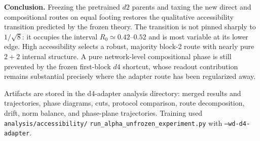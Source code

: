\documentclass[10pt]{article}
\begin{document}
\textbf{Conclusion.}
Freezing the pretrained $d2$ parents and taxing the new direct and compositional routes on
equal footing restores the qualitative accessibility transition predicted by the frozen
theory.  The transition is not pinned sharply to $1/\sqrt8$: it occupies the interval
$R_0\simeq0.42$--$0.52$ and is most variable at its lower edge.  High accessibility selects
a robust, majority block-2 route with nearly pure $2{+}2$ internal structure.  A pure
network-level compositional phase is still prevented by the frozen first-block $d4$
shortcut, whose readout contribution remains substantial precisely where the adapter route
has been regularized away.

\vspace{2pt}
\footnotesize
Artifacts are stored in the d4-adapter analysis directory: merged results and trajectories,
phase diagrams, cuts, protocol comparison, route decomposition, drift, norm balance, and
phase-plane trajectories.  Training used
\texttt{analysis/accessibility/}\allowbreak
\texttt{run\_alpha\_unfrozen\_experiment.py} with \texttt{--wd-d4-adapter}.
\end{document}

